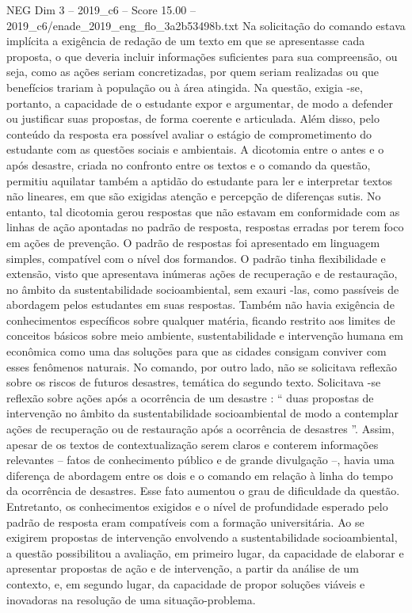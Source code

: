 \begin{textsample}{NEG Dim 3 – 2019\_c6 – Score 15.00 – 2019\_c6/enade\_2019\_eng\_flo\_3a2b53498b.txt}
Na solicitação do comando estava implícita a exigência de redação de um texto em que se apresentasse cada proposta, o que deveria incluir informações suficientes para sua compreensão, ou seja, como as ações seriam concretizadas, por quem seriam realizadas ou que benefícios trariam à população ou à área atingida.
Na questão, exigia -se, portanto, a capacidade de o estudante expor e argumentar, de modo a defender ou justificar suas propostas, de forma coerente e articulada.
Além disso, pelo conteúdo da resposta era possível avaliar o estágio de comprometimento do estudante com as questões sociais e ambientais.
A dicotomia entre o antes e o após desastre, criada no confronto entre os textos e o comando da questão, permitiu aquilatar também a aptidão do estudante para ler e interpretar textos não lineares, em que são exigidas atenção e percepção de diferenças sutis.
No entanto, tal dicotomia gerou respostas que não estavam em conformidade com as linhas de ação apontadas no padrão de resposta, respostas erradas por terem foco em ações de prevenção.
O padrão de respostas foi apresentado em linguagem simples, compatível com o nível dos formandos.
O padrão tinha flexibilidade e extensão, visto que apresentava inúmeras ações de recuperação e de restauração, no âmbito da sustentabilidade socioambiental, sem exauri -las, como passíveis de abordagem pelos estudantes em suas respostas.
Também não havia exigência de conhecimentos específicos sobre qualquer matéria, ficando restrito aos limites de conceitos básicos sobre meio ambiente, sustentabilidade e intervenção humana em econômica como uma das soluções para que as cidades consigam conviver com esses fenômenos naturais.
No comando, por outro lado, não se solicitava reflexão sobre os riscos de futuros desastres, temática do segundo texto.
Solicitava -se reflexão sobre ações após a ocorrência de um desastre : “ duas propostas de intervenção no âmbito da sustentabilidade socioambiental de modo a contemplar ações de recuperação ou de restauração após a ocorrência de desastres ”.
Assim, apesar de os textos de contextualização serem claros e conterem informações relevantes – fatos de conhecimento público e de grande divulgação –, havia uma diferença de abordagem entre os dois e o comando em relação à linha do tempo da ocorrência de desastres.
Esse fato aumentou o grau de dificuldade da questão.
Entretanto, os conhecimentos exigidos e o nível de profundidade esperado pelo padrão de resposta eram compatíveis com a formação universitária.
Ao se exigirem propostas de intervenção envolvendo a sustentabilidade socioambiental, a questão possibilitou a avaliação, em primeiro lugar, da capacidade de elaborar e apresentar propostas de ação e de intervenção, a partir da análise de um contexto, e, em segundo lugar, da capacidade de propor soluções viáveis e inovadoras na resolução de uma situação-problema.

\end{textsample}
